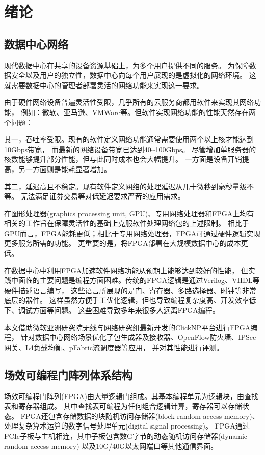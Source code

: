 \chapter{绪论}
\section{数据中心网络}
现代数据中心在共享的设备资源基础上，为多个用户提供不同的服务。
为保障数据安全以及用户的独立性，数据中心向每个用户展现的是虚拟化的网络环境。
这就需要数据中心的管理者部署灵活的网络功能来实现这一要求。

由于硬件网络设备普遍灵活性受限，几乎所有的云服务商都用软件来实现其网络功能，
例如：微软、亚马逊、VMWare等。但软件实现网络功能的性能天然存在两个问题：

其一，吞吐率受限。现有的软件定义网络功能通常需要使用两个以上核才能达到10Gbps带宽，
而最新的网络设备带宽已达到40\textasciitilde 100Gbps。
尽管增加单服务器的核数能够提升部分性能，但与此同时成本也会大幅提升。
一方面是设备开销提高，另一方面则是能耗显著增加。

其二，延迟高且不稳定。现有软件定义网络的处理延迟从几十微秒到毫秒量级不等。
无法满足证券交易等对低延迟要求严苛的应用需求。

在图形处理器(graphics processing unit, GPU)、专用网络处理器和FPGA上均有相关的工作旨在保障灵活性的基础上克服软件处理网络包的上述限制。
相比于GPU而言，FPGA能耗更低；相比于专用网络处理器，FPGA可通过硬件逻辑实现更多服务所需的功能。
更重要的是，将FPGA部署在大规模数据中心的成本更低。

在数据中心中利用FPGA加速软件网络功能从预期上能够达到较好的性能，
但实践中面临的主要问题是编程方面困难。传统的FPGA逻辑是通过Verilog、VHDL等硬件描述语言编写，
这些语言所展现的是门、寄存器、多路选择器、时钟等非常底层的器件。
这样虽然方便手工优化逻辑，但也导致编程复杂度高、开发效率低下、调试方面等问题。
这些困难导致多年来很多人远离FPGA编程。

本文借助微软亚洲研究院无线与网络研究组最新开发的ClickNP平台进行FPGA编程，
针对数据中心网络场景优化了包生成器及接收器、OpenFlow防火墙、IPSec网关、L4负载均衡、pFabric流调度器等应用，
并对其性能进行评测。

\section{场效可编程门阵列体系结构}
场效可编程门阵列(FPGA)由大量逻辑门组成。其基本编程单元为逻辑块，由查找表和寄存器组成。
其中查找表可编程为任何组合逻辑计算，寄存器可以存储状态。
FPGA还包含存储数据的块随机访问存储器(block random access memory)、
处理复杂算术运算的数字信号处理单元(digital signal processing)。
FPGA通过PCIe子板与主机相连，其中子板包含数G字节的动态随机访问存储器(dynamic random access memory)
以及10G/40G以太网端口等其他通信界面。

